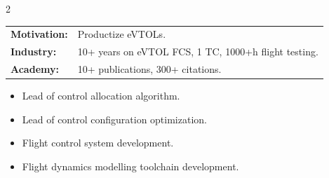 \documentclass[10pt,a4paper,ragged2e,withhyper]{altacv}
\begin{document}
\begin{paracol}{2}
        
        
        
        \switchcolumn
        
        
            \begin{tabular}{@{}ll}
                \textbf{Motivation:} & Productize eVTOLs. \\[0.2em]
                \textbf{Industry:}   & 10+ years on eVTOL FCS, 1 TC, 1000+h flight testing.\\[0.2em]
                \textbf{Academy:}    & 10+ publications, 300+ citations.\\ %
            \end{tabular}
            
        
            \begin{itemize}
                \item Lead of control allocation algorithm.
                \item Lead of control configuration optimization.
                \item Flight control system development.
                \item Flight dynamics modelling toolchain development.
            \end{itemize}
            \bigskip


\end{paracol}
\end{document}
